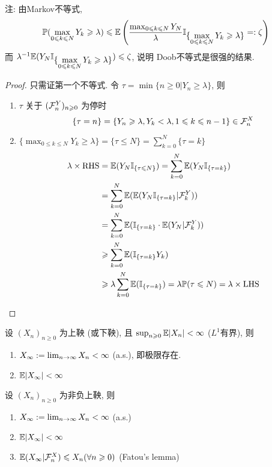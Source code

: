 注: 由Markov不等式,
\[
\mathbb{P}(\max_{0\leqslant k\leqslant N}Y_k\geqslant \lambda)\leqslant \mathbb E\left(
    \frac{\max_{0\leqslant k\leqslant N}Y_N}{\lambda}\mathbb I_{\displaystyle\{\max_{0\leqslant k\leqslant N}Y_k\geqslant \lambda\}}=:\zeta
\right)
\]
而 $\lambda^{-1}\mathbb E(Y_N\mathbb I_{\displaystyle\{\max_{0\leqslant k\leqslant N}Y_k\geqslant \lambda\}})\leqslant \zeta$, 说明 Doob不等式是很强的结果.

\begin{proof}
    只需证第一个不等式. 令 $\tau=\min\{n\geq 0|Y_n\geq \lambda\}$, 则
\begin{enumerate}
    \item $\tau$ 关于 $(\mathcal{F}_n^Y)_{n\geqslant 0}$ 为停时
    \[
    \{\tau=n\}=\{Y_n\geqslant \lambda,Y_k<\lambda,1\leqslant k\leqslant n-1\}\in\mathcal{F}_n^X
    \]
    \item $\displaystyle\{\max_{0\leq k\leq N}Y_k\geq \lambda\}=\{\tau\leq N\}=\sum_{k=0}^N\{\tau=k\}$
    \[
    \begin{aligned}
        \lambda \times \operatorname{RHS} &=\mathbb E(Y_N\mathbb I_{\{\tau\leqslant N\}})
        =\sum_{k=0}^N \mathbb E(Y_N\mathbb I_{\{\tau=k\}})\\
        &=\sum_{k=0}^N \mathbb E(\mathbb E(Y_N\mathbb I_{\{\tau=k\}}|\mathcal{F}_k^Y))\\
        &=\sum_{k=0}^N \mathbb E(\mathbb I_{\{\tau=k\}}\cdot \mathbb E(Y_N|\mathcal{F}_k^Y))\\
        &\geqslant \sum_{k=0}^N \mathbb E(\mathbb I_{\{\tau=k\}}Y_k)\\
        &\geqslant \lambda \sum_{k=0}^N\mathbb E(\mathbb I_{\{\tau=k\}})=\lambda \mathbb{P}(\tau\leqslant N)=\lambda\times \operatorname{LHS}
    \end{aligned}
    \]
\end{enumerate}
\end{proof}

\begin{theorem}[鞅收敛定理]\label{thm:p160-thm2}
    设 $(X_n)_{n\geq 0}$ 为上鞅 (或下鞅), 且 $\sup_{n\geqslant 0}\mathbb E |X_n|<\infty$ ($L^1$有界), 则
    \begin{enumerate}
        \item $X_{\infty}:=\lim_{n \to \infty}X_n<\infty$ (a.s.), 即极限存在.
        \item $\mathbb E |X_{\infty}|<\infty$
    \end{enumerate}
\end{theorem}

\begin{corollary}\label{cor:p160-cor}
    设 $(X_n)_{n\geq 0}$ 为非负上鞅, 则
    \begin{enumerate}
        \item $X_{\infty}:=\lim_{n \to \infty}X_n<\infty$ (a.s.)
        \item $\mathbb E |X_{\infty}|<\infty$
        \item $\mathbb E(X_{\infty}|\mathcal{F}_n^X)\leqslant X_n (\forall n\geqslant 0)$ (Fatou's lemma)
    \end{enumerate}
\end{corollary}

